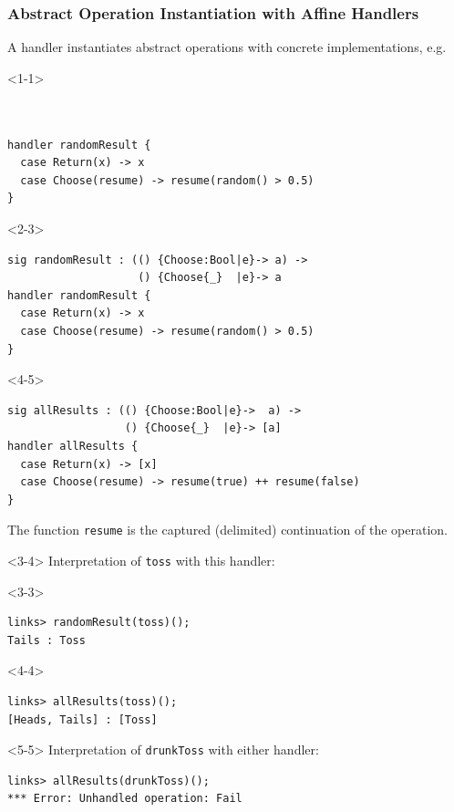 \documentclass[10pt,compress]{beamer}
\begin{document}
\begin{frame}[fragile]
  \frametitle{Abstract Operation Instantiation with Affine Handlers} 
%
  A handler instantiates abstract operations with concrete
  implementations, e.g.
\begin{onlyenv}<1-1>
\begin{lstlisting}


handler randomResult {
  case Return(x) -> x
  case Choose(resume) -> resume(random() > 0.5)
}
\end{lstlisting}
\end{onlyenv}
%
\begin{onlyenv}<2-3>
\begin{lstlisting}
sig randomResult : (() {Choose:Bool|e}-> a) -> 
                    () {Choose{_}  |e}-> a
handler randomResult {
  case Return(x) -> x
  case Choose(resume) -> resume(random() > 0.5)
}
\end{lstlisting}
\end{onlyenv}
%
\begin{onlyenv}<4-5>
\begin{lstlisting}
sig allResults : (() {Choose:Bool|e}->  a) -> 
                  () {Choose{_}  |e}-> [a]
handler allResults {
  case Return(x) -> [x]
  case Choose(resume) -> resume(true) ++ resume(false)
}
\end{lstlisting}
\end{onlyenv}
%
The function \lstinline$resume$ is the captured (delimited) continuation of the operation.
\vfill
\begin{onlyenv}<3-4>
Interpretation of \lstinline$toss$ with this handler:
\begin{onlyenv}<3-3>
\begin{lstlisting}[style=terminal]
links> randomResult(toss)();
Tails : Toss
\end{lstlisting}
\end{onlyenv}
%
\begin{onlyenv}<4-4>
\begin{lstlisting}[style=terminal]
links> allResults(toss)();
[Heads, Tails] : [Toss]
\end{lstlisting}
\end{onlyenv}
\end{onlyenv}

\begin{onlyenv}<5-5>
Interpretation of \lstinline$drunkToss$ with either handler:
\begin{lstlisting}[style=terminal]
links> allResults(drunkToss)();
*** Error: Unhandled operation: Fail
\end{lstlisting}
\end{onlyenv}
\end{frame}
\end{document}
